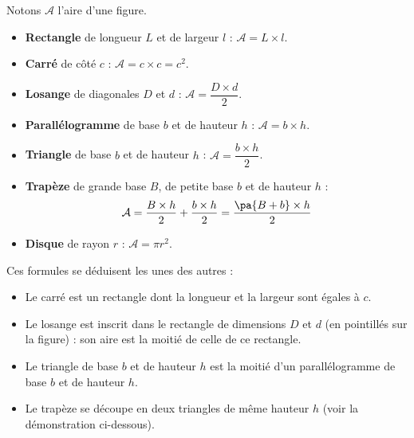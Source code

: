 \begin{prop}
\begin{center}
	\end{center}

	Notons $\mathcal{A}$ l'aire d'une figure.
	
	\begin{itemize}
		\item \textbf{Rectangle} de longueur $L$ et de largeur $l$ : $\mathcal{A} = L \times l$.
		\item \textbf{Carré} de côté $c$ : $\mathcal{A} = c \times c = c^2$.
		\item \textbf{Losange} de diagonales $D$ et $d$ : $\mathcal{A} = \dfrac{D \times d}{2}$.
		\item \textbf{Parallélogramme} de base $b$ et de hauteur $h$ : $\mathcal{A} = b \times h$.
		\item \textbf{Triangle} de base $b$ et de hauteur $h$ : $\mathcal{A} = \dfrac{b \times h}{2}$.
		\item \textbf{Trapèze} de grande base $B$, de petite base $b$ et de hauteur $h$ :
		      \[
			      \mathcal{A} = \dfrac{B \times h}{2} + \dfrac{b \times h}{2} = \dfrac{\pa{B + b} \times h}{2}
		      \]
		\item \textbf{Disque} de rayon $r$ : $\mathcal{A} = \pi r^2$.
	\end{itemize}
\end{prop}

\begin{rem}
	Ces formules se déduisent les unes des autres :

	\begin{itemize}
		\item Le carré est un rectangle dont la longueur et la largeur sont égales à $c$.
		\item Le losange est inscrit dans le rectangle de dimensions $D$ et $d$ (en pointillés sur la figure) : son aire est la moitié de celle de ce rectangle.
		\item Le triangle de base $b$ et de hauteur $h$ est la moitié d'un parallélogramme de base $b$ et de hauteur $h$.
		\item Le trapèze se découpe en deux triangles de même hauteur $h$ (voir la démonstration ci-dessous).
	\end{itemize}
\end{rem}

